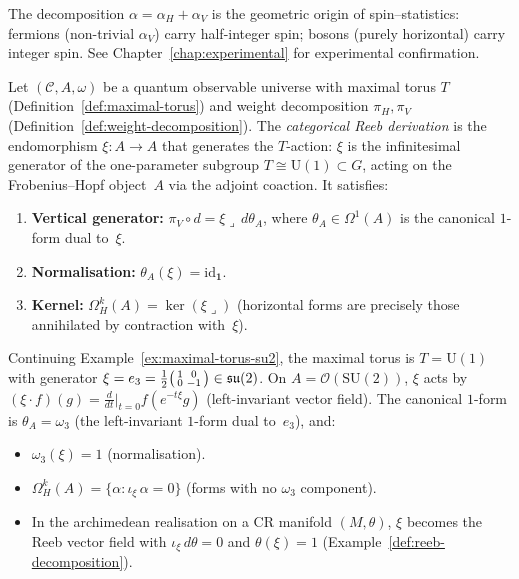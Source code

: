 \begin{remark}
\label{rem:reeb-physical}
The decomposition $\alpha = \alpha_H + \alpha_V$ is the geometric origin of
spin--statistics: fermions (non-trivial $\alpha_V$) carry half-integer spin;
bosons (purely horizontal) carry integer spin.  See
Chapter~\ref{chap:experimental} for experimental confirmation.
\end{remark}

\begin{definition}
\label{def:categorical-reeb}
Let $(\mathcal{C}, A, \omega)$ be a quantum observable universe with
maximal torus $T$ (Definition~\ref{def:maximal-torus}) and weight
decomposition $\pi_H, \pi_V$
(Definition~\ref{def:weight-decomposition}).  The \emph{categorical
Reeb derivation} is the endomorphism $\xi \colon A \to A$ that
generates the $T$-action: $\xi$ is the infinitesimal generator of the
one-parameter subgroup $T \cong \mathrm{U}(1) \subset G$, acting on
the Frobenius--Hopf object~$A$ via the adjoint coaction.  It satisfies:
\begin{enumerate}
  \item \textbf{Vertical generator:}\;
        $\pi_V \circ d = \xi \lrcorner\, d\theta_A$, where
        $\theta_A \in \Omega^1(A)$ is the canonical $1$-form dual to~$\xi$.
  \item \textbf{Normalisation:}\;
        $\theta_A(\xi) = \mathrm{id}_{\mathbf{1}}$.
  \item \textbf{Kernel:}\;
        $\Omega^k_H(A) = \ker(\xi \lrcorner)$ (horizontal forms are
        precisely those annihilated by contraction with~$\xi$).
\end{enumerate}
\end{definition}

\begin{example}
\label{ex:reeb-su2}
Continuing Example~\ref{ex:maximal-torus-su2}, the maximal torus is
$T = \mathrm{U}(1)$ with generator
$\xi = e_3 = \frac{1}{2}\begin{psmallmatrix} 1 & 0 \\ 0 & -1
\end{psmallmatrix} \in \mathfrak{su}(2)$.
On $A = \mathcal{O}(\mathrm{SU}(2))$, $\xi$ acts by
$(\xi \cdot f)(g) = \frac{d}{dt}\big|_{t=0} f(e^{-t\xi} g)$
(left-invariant vector field).  The canonical $1$-form is
$\theta_A = \omega_3$ (the left-invariant $1$-form dual to~$e_3$), and:
\begin{itemize}
  \item $\omega_3(\xi) = 1$ (normalisation).
  \item $\Omega^k_H(A) = \{\alpha : \iota_\xi\,\alpha = 0\}$
        (forms with no $\omega_3$ component).
  \item In the archimedean realisation on a CR manifold $(M, \theta)$,
        $\xi$ becomes the Reeb vector field with $\iota_\xi\,d\theta = 0$
        and $\theta(\xi) = 1$
        (Example~\ref{def:reeb-decomposition}).
\end{itemize}
\end{example}

